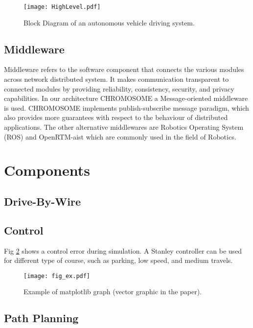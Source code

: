 \documentclass[10 pt,letterpaper,conference]{IEEEtran}
\begin{document}
\begin{figure}[!t]
\centering
\texttt{[image: HighLevel.pdf]}
\caption{Block Diagram of an autonomous vehicle driving system.}
\label{fig_1}
\end{figure}

\subsection{Middleware}\label{middleware}

Middleware refers to the software component that connects the various
modules across network distributed system. It makes communication
transparent to connected modules by providing reliability, consistency,
security, and privacy capabilities. In our architecture
CHROMOSOME\citep{CHROMOSOME} a Message-oriented middleware is used.
CHROMOSOME implements publish-subscribe message paradigm, which also
provides more guarantees with respect to the behaviour of distributed
applications. \citep{buckl2014chromosome} The other alternative
middlewares are Robotics Operating System (ROS) \citep{quigley2009ros}
and OpenRTM-aist \citep{ando2005rt} which are commonly used in the field
of Robotics.

\section{Components}\label{components}

\subsection{Drive-By-Wire}\label{drive-by-wire}

\subsection{Control}\label{control}

Fig \ref{fig_2} shows a control error during simulation. A Stanley
controller can be used for different type of course, such as parking,
low speed, and medium travels.

\begin{figure}[!t]
\centering
\texttt{[image: fig\_ex.pdf]}
\caption{Example of matplotlib graph (vector graphic in the paper).}
\label{fig_2}
\end{figure}

\subsection{Path Planning}\label{path-planning}
\end{document}
